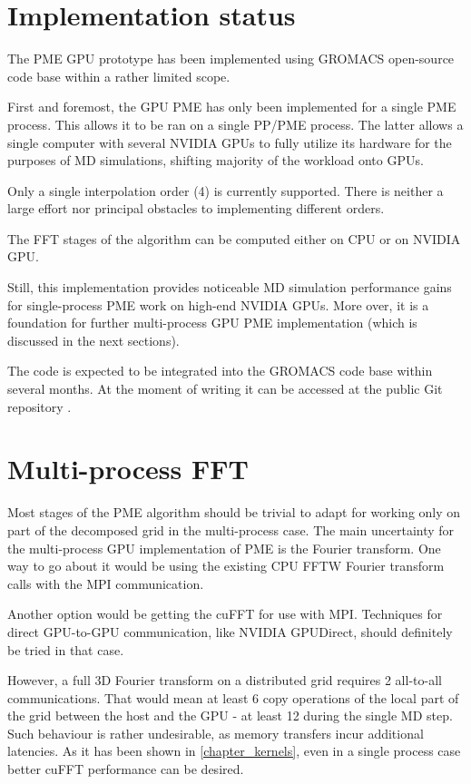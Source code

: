 \documentclass[12pt,a4paper]{report}
\newcommand{\draft}[1]{#1}
\begin{document}
\section{Implementation status}
The PME GPU prototype has been implemented using GROMACS open-source code base within a rather limited scope. 

First and foremost, the GPU PME has only been implemented for a single PME process. This allows it to be ran on a single PP/PME process. The latter allows a single computer with several NVIDIA GPUs to fully utilize its hardware for the purposes of MD simulations, shifting majority of the workload onto GPUs.

Only a single interpolation order (4) is currently supported. There is neither a large effort nor principal obstacles to implementing different orders. 

The FFT stages of the algorithm can be computed either on CPU  or on NVIDIA GPU.

\draft{
Still, this implementation provides noticeable MD simulation performance gains for single-process PME work on high-end NVIDIA GPUs.
More over, it is a foundation for further multi-process GPU PME implementation (which is discussed in the next sections).
}

The code is expected to be integrated into the GROMACS code base within several months. At the moment of writing it can be accessed at the public Git repository \cite{pmegpugit}.

\section{Multi-process FFT}

Most stages of the PME algorithm should be trivial to adapt for working only on part of the decomposed grid in the multi-process case.
The main uncertainty for the multi-process GPU implementation of PME is the Fourier transform. One way to go about it would be using the existing CPU FFTW Fourier transform calls with the MPI communication.

Another option would be getting the cuFFT for use with MPI. Techniques for direct GPU-to-GPU communication, like NVIDIA GPUDirect, should definitely be tried in that case.

However, a full 3D Fourier transform on a distributed grid requires 2 all-to-all communications. That would mean at least 6 copy operations of the local part of the grid between the host and the GPU - at least 12 during the single MD step. Such behaviour is rather undesirable, as memory transfers incur additional latencies.
As it has been shown in \ref{chapter_kernels}, even in a single process case better cuFFT performance can be desired.
\end{document}
